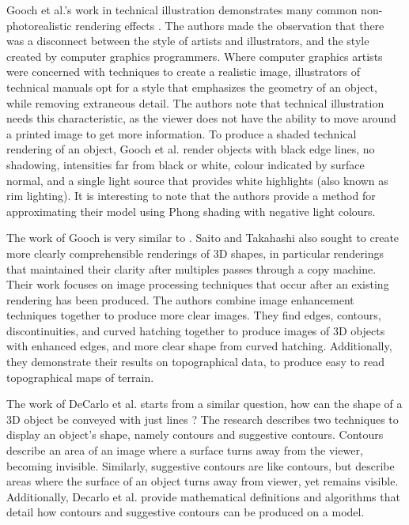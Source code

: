 Gooch et al.'s work in technical illustration demonstrates many common non-photorealistic 
rendering effects \cite{gooch98}. The authors made the observation that there was a 
disconnect between the style of artists and illustrators, and the style created by computer 
graphics programmers. Where computer graphics artists were concerned with techniques to 
create a realistic image, illustrators of technical manuals opt for a style that emphasizes
the geometry of an object, while removing extraneous detail. The authors note that technical
illustration needs this characteristic, as the viewer does not have the ability to move
around a printed image to get more information. To produce a shaded technical rendering of
an object, Gooch et al. render objects with black edge lines, no shadowing, intensities far 
from black or white, colour indicated by surface normal, and a single light source that 
provides white highlights (also known as rim lighting). It is interesting to note that the 
authors provide a method for approximating their model using Phong shading with negative 
light colours.

The work of Gooch is very similar to \cite{saito90}. Saito and Takahashi also sought to create
more clearly comprehensible renderings of 3D shapes, in particular renderings that maintained
their clarity after multiples passes through a copy machine. Their work focuses on image 
processing techniques that occur after an existing rendering has been produced. The authors 
combine image enhancement techniques together to produce more clear images. They find edges, 
contours, discontinuities, and curved hatching together to produce images of 3D objects with
enhanced edges, and more clear shape from curved hatching. Additionally, they demonstrate
their results on topographical data, to produce easy to read topographical maps of terrain.

The work of DeCarlo et al. starts from a similar question, how can the shape of a 3D object be
conveyed with just lines \cite{decarlo03}? The research describes two techniques to display 
an object's shape, namely contours and suggestive contours. Contours describe an area of an 
image where a surface turns away from the viewer, becoming invisible. Similarly, suggestive
contours are like contours, but describe areas where the surface of an object turns away from
viewer, yet remains visible. Additionally, Decarlo et al. provide mathematical definitions
and algorithms that detail how contours and suggestive contours can be produced on a model.


